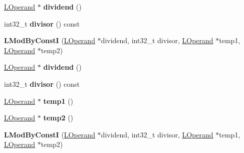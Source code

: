 \begin{DoxyCompactItemize}
\item 
\hyperlink{classv8_1_1internal_1_1_l_operand}{L\+Operand} $\ast$ {\bfseries dividend} ()\hypertarget{classv8_1_1internal_1_1_l_mod_by_const_i_aeb9656f49d65a07307ea1a8d195f37f9}{}\label{classv8_1_1internal_1_1_l_mod_by_const_i_aeb9656f49d65a07307ea1a8d195f37f9}

\item 
int32\+\_\+t {\bfseries divisor} () const \hypertarget{classv8_1_1internal_1_1_l_mod_by_const_i_a3c44698a4d3f5b97d2d382e3d63510e3}{}\label{classv8_1_1internal_1_1_l_mod_by_const_i_a3c44698a4d3f5b97d2d382e3d63510e3}

\item 
{\bfseries L\+Mod\+By\+ConstI} (\hyperlink{classv8_1_1internal_1_1_l_operand}{L\+Operand} $\ast$dividend, int32\+\_\+t divisor, \hyperlink{classv8_1_1internal_1_1_l_operand}{L\+Operand} $\ast$temp1, \hyperlink{classv8_1_1internal_1_1_l_operand}{L\+Operand} $\ast$temp2)\hypertarget{classv8_1_1internal_1_1_l_mod_by_const_i_a0aa64ca8d64ffbe21dca974459eeca5c}{}\label{classv8_1_1internal_1_1_l_mod_by_const_i_a0aa64ca8d64ffbe21dca974459eeca5c}

\item 
\hyperlink{classv8_1_1internal_1_1_l_operand}{L\+Operand} $\ast$ {\bfseries dividend} ()\hypertarget{classv8_1_1internal_1_1_l_mod_by_const_i_aeb9656f49d65a07307ea1a8d195f37f9}{}\label{classv8_1_1internal_1_1_l_mod_by_const_i_aeb9656f49d65a07307ea1a8d195f37f9}

\item 
int32\+\_\+t {\bfseries divisor} () const \hypertarget{classv8_1_1internal_1_1_l_mod_by_const_i_a3c44698a4d3f5b97d2d382e3d63510e3}{}\label{classv8_1_1internal_1_1_l_mod_by_const_i_a3c44698a4d3f5b97d2d382e3d63510e3}

\item 
\hyperlink{classv8_1_1internal_1_1_l_operand}{L\+Operand} $\ast$ {\bfseries temp1} ()\hypertarget{classv8_1_1internal_1_1_l_mod_by_const_i_aabd5104c1bee0961a7b736ab37c10a79}{}\label{classv8_1_1internal_1_1_l_mod_by_const_i_aabd5104c1bee0961a7b736ab37c10a79}

\item 
\hyperlink{classv8_1_1internal_1_1_l_operand}{L\+Operand} $\ast$ {\bfseries temp2} ()\hypertarget{classv8_1_1internal_1_1_l_mod_by_const_i_a06f95f7010599c83bd9b16e5dfc293d2}{}\label{classv8_1_1internal_1_1_l_mod_by_const_i_a06f95f7010599c83bd9b16e5dfc293d2}

\item 
{\bfseries L\+Mod\+By\+ConstI} (\hyperlink{classv8_1_1internal_1_1_l_operand}{L\+Operand} $\ast$dividend, int32\+\_\+t divisor, \hyperlink{classv8_1_1internal_1_1_l_operand}{L\+Operand} $\ast$temp1, \hyperlink{classv8_1_1internal_1_1_l_operand}{L\+Operand} $\ast$temp2)\hypertarget{classv8_1_1internal_1_1_l_mod_by_const_i_a0aa64ca8d64ffbe21dca974459eeca5c}{}\label{classv8_1_1internal_1_1_l_mod_by_const_i_a0aa64ca8d64ffbe21dca974459eeca5c}


\end{DoxyCompactItemize}
